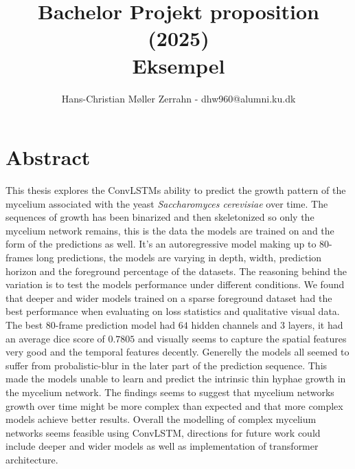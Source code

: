 \documentclass[a4paper,12pt]{article}
\begin{document}
\title{Bachelor Projekt proposition (2025)\\ Eksempel}
\author{\color{red}Hans-Christian Møller Zerrahn - dhw960@alumni.ku.dk}
\date{}
\maketitle

\tableofcontents %
\newpage %
\section{Abstract}
This thesis explores the ConvLSTMs ability to predict the growth pattern of the mycelium associated with the yeast \textit{Saccharomyces cerevisiae} over time. The sequences of growth has been binarized and then skeletonized so only the mycelium network remains, this is the data the models are trained on and the form of the predictions as well.
It's an autoregressive model making up to $80$-frames long predictions, the models are varying in depth, width, prediction horizon and the foreground percentage of the datasets. The reasoning behind the variation is to test the models performance under different conditions.
We found that deeper and wider models trained on a sparse foreground dataset had the best performance when evaluating on loss statistics and qualitative visual data. The best $80$-frame prediction model had $64$ hidden channels and $3$ layers, it had an average dice score of $0.7805$ and visually seems to capture the spatial features very good and the temporal features decently.
Generelly the models all seemed to suffer from probalistic-blur in the later part of the prediction sequence. This made the models unable to learn and predict the intrinsic thin hyphae growth in the mycelium network. The findings seems to suggest that mycelium networks growth over time might be more complex than expected and that more complex models achieve better results.
Overall the modelling of complex mycelium networks seems feasible using ConvLSTM, directions for future work could include deeper and wider models as well as implementation of transformer architecture.
\end{document}
